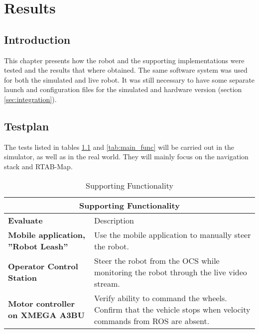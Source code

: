 \chapter{Results}
\label{chp:results} 

\section{Introduction}

This chapter presents how the robot and the supporting implementations were tested and the results that where obtained. The same software system was used for both the simulated and live robot. It was still necessary to have some separate launch and configuration files for the simulated and hardware version (section \ref{sec:integration}). 



\section{Testplan}

The tests listed in tables \ref{tab:support_func} and \ref{tab:main_func} will be carried out in the simulator, as well as in the real world. They will mainly focus on the navigation stack and \ac{RTAB-Map}. 

\begin{table}
	\centering
	\begin{tabular}{ p{3.5cm} | p{7cm} }
		\multicolumn{2}{c}{Supporting Functionality}\\
		\hline
		\textbf{Evaluate} & Description\\
		\hline
		\textbf{Mobile application, ''Robot Leash''} & Use the mobile application to manually steer the robot.\\
		\hline
		\textbf{Operator Control Station} & Steer the robot from the \ac{OCS} while monitoring the robot through the live video stream. \\
		\hline
		\textbf{Motor controller on XMEGA A3BU} & Verify ability to command the wheels. Confirm that the vehicle stops when velocity commands from \ac{ROS} are absent.\\
		\hline
	\end{tabular}
	\caption{Supporting Functionality}\label{tab:support_func}
\end{table}

